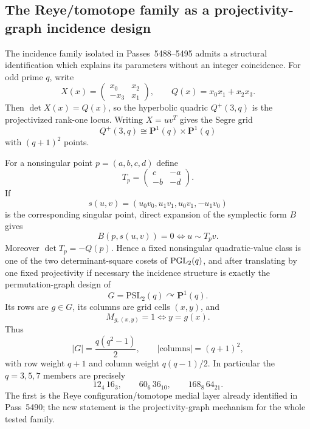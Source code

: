 \subsection{The Reye/tomotope family as a projectivity-graph incidence design}
\label{sec:pass5580-reye-psl2}

The incidence family isolated in Passes~5488--5495 admits a structural
identification which explains its parameters without an integer coincidence.
For odd prime $q$, write
\[
 X(x)=\begin{pmatrix}x_0&x_2\\-x_3&x_1\end{pmatrix},
 \qquad
 Q(x)=x_0x_1+x_2x_3.
\]
Then $\det X(x)=Q(x)$, so the hyperbolic quadric $Q^+(3,q)$ is the
projectivized rank-one locus.  Writing $X=uv^T$ gives the Segre grid
\[
 \boxed{Q^+(3,q)\cong\mathbf P^1(q)\times\mathbf P^1(q)}
\]
with $(q+1)^2$ points.

For a nonsingular point $p=(a,b,c,d)$ define
\[
 T_p=\begin{pmatrix}c&-a\\-b&-d\end{pmatrix}.
\]
If
\[
 s(u,v)=(u_0v_0,u_1v_1,u_0v_1,-u_1v_0)
\]
is the corresponding singular point, direct expansion of the symplectic form
$B$ gives
\[
 \boxed{B(p,s(u,v))=0\iff u\sim T_pv.}
\]
Moreover $\det T_p=-Q(p)$.  Hence a fixed nonsingular quadratic-value class is
one of the two determinant-square cosets of $\mathrm{PGL}_2(q)$, and after translating
by one fixed projectivity if necessary the incidence structure is exactly the
permutation-graph design of
\[
 G=\mathrm{PSL}_2(q)\curvearrowright\mathbf P^1(q).
\]
Its rows are $g\in G$, its columns are grid cells $(x,y)$, and
\[
 M_{g,(x,y)}=1\iff y=g(x).
\]
Thus
\[
 |G|=\frac{q(q^2-1)}2,
 \qquad
 |\text{columns}|=(q+1)^2,
\]
with row weight $q+1$ and column weight $q(q-1)/2$.  In particular the
$q=3,5,7$ members are precisely
\[
 12_4\,16_3,\qquad 60_6\,36_{10},\qquad 168_8\,64_{21}.
\]
The first is the Reye configuration/tomotope medial layer already identified
in Pass~5490; the new statement is the projectivity-graph mechanism for the
whole tested family.

